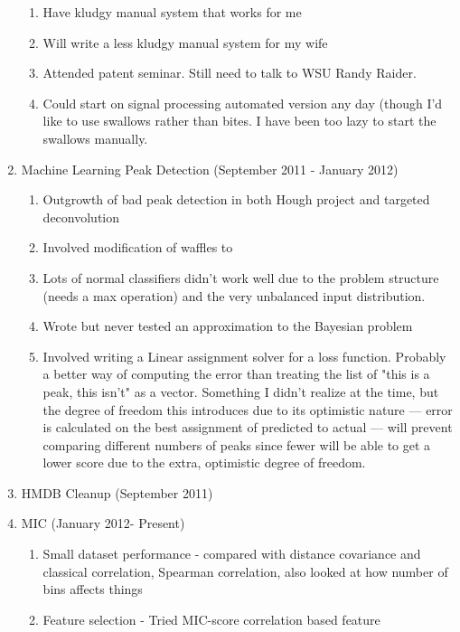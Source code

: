 \documentclass[english]{article}
\begin{document}
\begin{enumerate}
      \begin{enumerate}
      \item Have kludgy manual system that works for me
      \item Will write a less kludgy manual system for my wife
      \item Attended patent seminar. Still need to talk to WSU Randy Raider.
      \item Could start on signal processing automated version any day (though
            I'd like to use swallows rather than bites. I have been too lazy to
            start the swallows manually.
      \end{enumerate}
\item Machine Learning Peak Detection (September 2011 - January 2012)
      \begin{enumerate}
      \item Outgrowth of bad peak detection in both Hough project and
            targeted deconvolution
      \item Involved modification of waffles to 
      \item Lots of normal classifiers didn't work well due to the problem
            structure (needs a max operation) and the very unbalanced input
            distribution.
      \item Wrote but never tested an approximation to the Bayesian problem
      \item Involved writing a Linear assignment solver for a loss
            function. Probably a better way of computing the error than treating
            the list of "this is a peak, this isn't" as a vector. Something I
            didn't realize at the time, but the degree of freedom this introduces
            due to its optimistic nature --- error is calculated on the 
            best assignment of predicted to actual --- will prevent comparing
            different numbers of peaks since fewer will be able to get a lower
            score due to the extra, optimistic degree of freedom.
      \end{enumerate}
\item HMDB Cleanup (September 2011)
\item MIC (January 2012- Present)
      \begin{enumerate}
      \item Small dataset performance - compared with distance covariance and
            classical correlation, Spearman correlation, also looked at 
            how number of bins affects things
      \item Feature selection - Tried MIC-score correlation based feature

\end{enumerate}
\end{enumerate}
\end{document}
